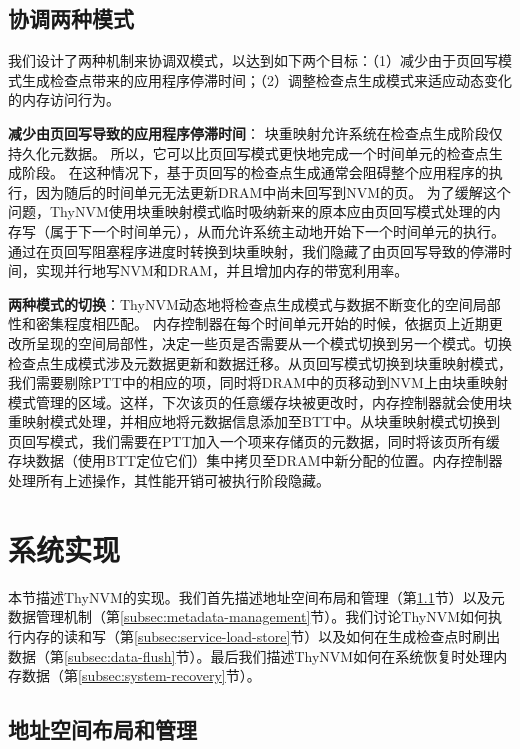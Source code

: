 \subsection{协调两种模式}
\label{subsec:coordination}

我们设计了两种机制来协调双模式，以达到如下两个目标：（1）减少由于页回写模式生成检查点带来的应用程序停滞时间；（2）调整检查点生成模式来适应动态变化的内存访问行为。

\textbf{减少由页回写导致的应用程序停滞时间}：
块重映射允许系统在检查点生成阶段仅持久化元数据。
所以，它可以比页回写模式更快地完成一个时间单元的检查点生成阶段。
在这种情况下，基于页回写的检查点生成通常会阻碍整个应用程序的执行，因为随后的时间单元无法更新DRAM中尚未回写到NVM的页。
为了缓解这个问题，ThyNVM使用块重映射模式临时吸纳新来的原本应由页回写模式处理的内存写（属于下一个时间单元），从而允许系统主动地开始下一个时间单元的执行。 
通过在页回写阻塞程序进度时转换到块重映射，我们隐藏了由页回写导致的停滞时间，实现并行地写NVM和DRAM，并且增加内存的带宽利用率。

\textbf{两种模式的切换}：ThyNVM动态地将检查点生成模式与数据不断变化的空间局部性和密集程度相匹配。
内存控制器在每个时间单元开始的时候，依据页上近期更改所呈现的空间局部性，决定一些页是否需要从一个模式切换到另一个模式。切换检查点生成模式涉及元数据更新和数据迁移。从页回写模式切换到块重映射模式，我们需要剔除PTT中的相应的项，同时将DRAM中的页移动到NVM上由块重映射模式管理的区域。这样，下次该页的任意缓存块被更改时，内存控制器就会使用块重映射模式处理，并相应地将元数据信息添加至BTT中。从块重映射模式切换到页回写模式，我们需要在PTT加入一个项来存储页的元数据，同时将该页所有缓存块数据（使用BTT定位它们）集中拷贝至DRAM中新分配的位置。内存控制器处理所有上述操作，其性能开销可被执行阶段隐藏。

\section{系统实现}
\label{sec:implementation}

本节描述ThyNVM的实现。我们首先描述地址空间布局和管理（第\ref{subsec:thynvm-space}节）以及元数据管理机制（第\ref{subsec:metadata-management}节）。我们讨论ThyNVM如何执行内存的读和写（第\ref{subsec:service-load-store}节）以及如何在生成检查点时刷出数据（第\ref{subsec:data-flush}节）。最后我们描述ThyNVM如何在系统恢复时处理内存数据（第\ref{subsec:system-recovery}节）。

\subsection{地址空间布局和管理}
\label{subsec:thynvm-space}

